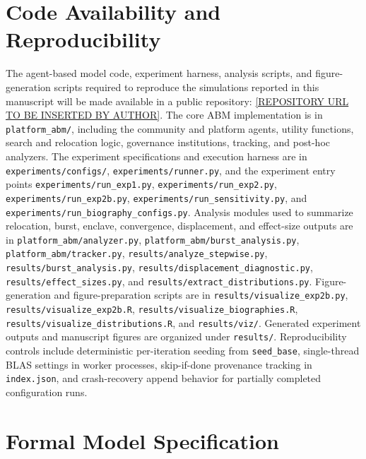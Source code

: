 \documentclass{article}
\begin{document}
\section*{Code Availability and Reproducibility}

The agent-based model code, experiment harness, analysis scripts, and figure-generation scripts required to reproduce the simulations reported in this manuscript will be made available in a public repository: \url{[REPOSITORY URL TO BE INSERTED BY AUTHOR]}. The core ABM implementation is in \texttt{platform\_abm/}, including the community and platform agents, utility functions, search and relocation logic, governance institutions, tracking, and post-hoc analyzers. The experiment specifications and execution harness are in \texttt{experiments/configs/}, \texttt{experiments/runner.py}, and the experiment entry points \texttt{experiments/run\_exp1.py}, \texttt{experiments/run\_exp2.py}, \texttt{experiments/run\_exp2b.py}, \texttt{experiments/run\_sensitivity.py}, and \texttt{experiments/run\_biography\_configs.py}. Analysis modules used to summarize relocation, burst, enclave, convergence, displacement, and effect-size outputs are in \texttt{platform\_abm/analyzer.py}, \texttt{platform\_abm/burst\_analysis.py}, \texttt{platform\_abm/tracker.py}, \texttt{results/analyze\_stepwise.py}, \texttt{results/burst\_analysis.py}, \texttt{results/displacement\_diagnostic.py}, \texttt{results/effect\_sizes.py}, and \texttt{results/extract\_distributions.py}. Figure-generation and figure-preparation scripts are in \texttt{results/visualize\_exp2b.py}, \texttt{results/visualize\_exp2b.R}, \texttt{results/visualize\_biographies.R}, \texttt{results/visualize\_distributions.R}, and \texttt{results/viz/}. Generated experiment outputs and manuscript figures are organized under \texttt{results/}. Reproducibility controls include deterministic per-iteration seeding from \texttt{seed\_base}, single-thread BLAS settings in worker processes, skip-if-done provenance tracking in \texttt{index.json}, and crash-recovery append behavior for partially completed configuration runs.
\newpage





\appendix

\section{Formal Model Specification}
\label{app:model}
\end{document}
